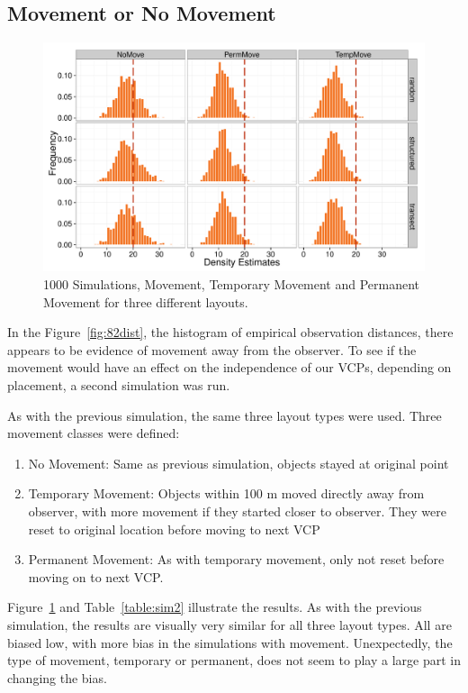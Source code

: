 \documentclass[12pt]{article}
\begin{document}
\subsection{Movement or No Movement}
\begin{figure}

	\includegraphics[width=\textwidth]{../images/MovementSim2.pdf}
	\caption{1000 Simulations, Movement, Temporary Movement and Permanent Movement for three different layouts. \label{fig:sim2}}
		
\end{figure}
In the Figure~\ref{fig:82dist}, the histogram of empirical observation distances, there appears to be evidence of movement away from the observer. To see if the movement would have an effect on the independence of our VCPs, depending on placement, a second simulation was run.

As with the previous simulation, the same three layout types were used. Three movement classes were defined:
\begin{enumerate}
\item No Movement: Same as previous simulation, objects stayed at original point
\item Temporary Movement: Objects within 100 m moved directly away from observer, with more movement if they started closer to observer. They were reset to original location before moving to next VCP
\item Permanent Movement: As with temporary movement, only not reset before moving on to next VCP.
\end{enumerate}

Figure~\ref{fig:sim2} and Table~\ref{table:sim2} illustrate the results. As with the previous simulation, the results are visually very similar for all three layout types. All are biased low, with more bias in the simulations with movement. Unexpectedly, the type of movement, temporary or permanent, does not seem to play a large part in changing the bias. 
\end{document}
